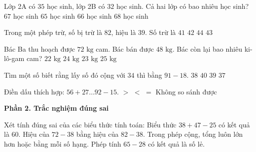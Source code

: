 \begin{ex} %
Lớp 2A có $35$ học sinh, lớp 2B có $32$ học sinh. Cả hai lớp có bao nhiêu học sinh?
\choice
{\True $67$ học sinh}
{$65$ học sinh}
{$66$ học sinh}
{$68$ học sinh}
\end{ex}

\begin{ex} %
Trong một phép trừ, số bị trừ là $82$, hiệu là $39$. Số trừ là
\choice
{$41$}
{$42$}
{$44$}
{\True $43$}
\end{ex}

\begin{ex} %
Bác Ba thu hoạch được $72\text{ kg}$ cam. Bác bán được $48\text{ kg}$. Bác còn lại bao nhiêu ki-lô-gam cam?
\choice
{$22\text{ kg}$}
{\True $24\text{ kg}$}
{$23\text{ kg}$}
{$25\text{ kg}$}
\end{ex}

\begin{ex} %
Tìm một số biết rằng lấy số đó cộng với $34$ thì bằng $91 - 18$.
\choice
{$38$}
{$40$}
{\True $39$}
{$37$}
\end{ex}

\begin{ex} %
Điền dấu thích hợp: $56 + 27 \dots 92 - 15$.
\choice
{\True $>$}
{$<$}
{$=$}
{Không so sánh được}
\end{ex}

\textbf{Phần 2. Trắc nghiệm đúng sai}

\begin{ex} %
Xét tính đúng sai của các biểu thức tính toán:
\choiceTF
{\True Biểu thức $38 + 47 - 25$ có kết quả là $60$.}
{Hiệu của $72 - 38$ bằng hiệu của $82 - 38$.}
{\True Trong phép cộng, tổng luôn lớn hơn hoặc bằng mỗi số hạng.}
{\True Phép tính $65 - 28$ có kết quả là số lẻ.}
\end{ex}

